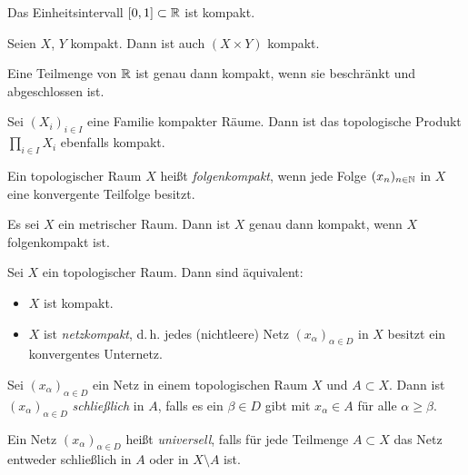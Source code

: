 \documentclass{cheat-sheet}
\begin{document}

\begin{prop}
  Das Einheitsintervall $\left[ 0, 1 \right] \subset \mathbb{R}$ ist kompakt.
\end{prop}

\begin{prop}
  Seien $X$, $Y$ kompakt. Dann ist auch $(X \times Y)$ kompakt.
\end{prop}

\begin{satz}
  Eine Teilmenge von $\mathbb{R}$ ist genau dann kompakt, wenn sie beschränkt und abgeschlossen ist.
\end{satz}

\begin{satz}
  Sei $(X_i)_{i \in I}$ eine Familie kompakter Räume. Dann ist das topologische Produkt $\prod_{i \in I} X_i$ ebenfalls kompakt.
\end{satz}

\begin{defn}
  Ein topologischer Raum $X$ heißt \emph{folgenkompakt}, wenn jede Folge $(x_n)_{n \in \mathbb{N}}$ in $X$ eine konvergente Teilfolge besitzt.
\end{defn}

\begin{prop}
  Es sei $X$ ein metrischer Raum. Dann ist $X$ genau dann kompakt, wenn $X$ folgenkompakt ist.
\end{prop}

\begin{prop}
  Sei $X$ ein topologischer Raum. Dann sind äquivalent:
  \begin{itemize}
    \item $X$ ist kompakt.
    \item $X$ ist \emph{netzkompakt}, d.\,h. jedes (nichtleere) Netz $(x_\alpha)_{\alpha \in D}$ in $X$ besitzt ein konvergentes Unternetz.
  \end{itemize}
\end{prop}

\begin{defn}
  Sei $(x_\alpha)_{\alpha \in D}$ ein Netz in einem topologischen Raum $X$ und $A \subset X$. Dann ist $(x_\alpha)_{\alpha \in D}$ \emph{schließlich} in $A$, falls es ein $\beta \in D$ gibt mit $x_\alpha \in A$ für alle $\alpha \geq \beta$.
\end{defn}


\begin{defn}
  Ein Netz $(x_\alpha)_{\alpha \in D}$ heißt \emph{universell}, falls für jede Teilmenge $A \subset X$ das Netz entweder schließlich in $A$ oder in $X \setminus A$ ist.
\end{defn}
\end{document}
